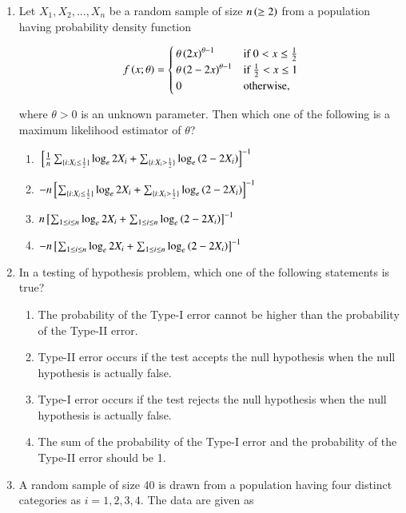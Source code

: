 \documentclass[journal]{IEEEtran}
\numberwithin{equation}{enumi}
\numberwithin{figure}{enumi}
\begin{document}
\begin{enumerate}
\item Let $X_1, X_2, ..., X_n$ be a random sample of size $n \left(\geq 2\right)$ from a population having probability density function

\[
f\left(x; \theta\right) = \begin{cases}
\theta\left(2x\right)^{\theta-1} & \text{if } 0 < x \leq \frac{1}{2} \\
\theta\left(2-2x\right)^{\theta-1} & \text{if } \frac{1}{2} < x \leq 1 \\
0 & \text{otherwise,}
\end{cases}
\]

where $\theta > 0$ is an unknown parameter. Then which one of the following is a maximum likelihood estimator of $\theta$?

\begin{enumerate}
    \item ${}\left[\frac{1}{n} \sum_{\{i: X_i \leq \frac{1}{2}\}} \log_e 2X_i + \sum_{\{i: X_i > \frac{1}{2}\}} \log_e \left(2-2X_i\right)\right]^{-1}$
    \item $-n {}\left[\sum_{\{i: X_i \leq \frac{1}{2}\}} \log_e 2X_i + \sum_{\{i: X_i > \frac{1}{2}\}} \log_e \left(2-2X_i\right)\right]^{-1}$
    \item $n {}\left[\sum_{1 \leq i \leq n} \log_e 2X_i + \sum_{1 \leq i \leq n} \log_e \left(2-2X_i\right)\right]^{-1}$
    \item $-n {}\left[\sum_{1 \leq i \leq n} \log_e 2X_i + \sum_{1 \leq i \leq n} \log_e \left(2-2X_i\right)\right]^{-1}$
\end{enumerate}

\item In a testing of hypothesis problem, which one of the following statements is true?

\begin{enumerate}
    \item The probability of the Type-I error cannot be higher than the probability of the Type-II error.
    \item Type-II error occurs if the test accepts the null hypothesis when the null hypothesis is actually false.
    \item Type-I error occurs if the test rejects the null hypothesis when the null hypothesis is actually false.
    \item The sum of the probability of the Type-I error and the probability of the Type-II error should be 1.
\end{enumerate}

\item A random sample of size 40 is drawn from a population having four distinct categories as $i = 1, 2, 3, 4$. The data are given as


\end{enumerate}
\end{document}
